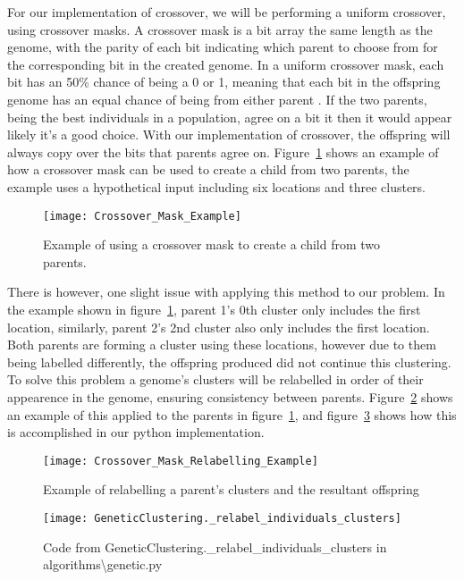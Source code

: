 \noindent
For our implementation of crossover, we will be performing a uniform crossover, using crossover masks.
A crossover mask is a bit array the same length as the genome, with the parity of each bit indicating which parent
to choose from for the corresponding bit in the created genome.
In a uniform crossover mask, each bit has an 50\% chance of being a 0 or 1, meaning that each bit in the offspring
genome has an equal chance of being from either parent
.
If the two parents, being the best individuals in a population, agree on a bit it then it would appear likely it's a
good choice.
With our implementation of crossover, the offspring will always copy over the bits that parents agree on.
Figure~\ref{fig:Crossover_Mask_Example} shows an example of how a crossover mask can be used to create a child from
two parents, the example uses a hypothetical input including six locations and three clusters.
\begin{figure}[H]
    \centering
    \texttt{[image: Crossover\_Mask\_Example]}
    \caption{Example of using a crossover mask to create a child from two parents.}\label{fig:Crossover_Mask_Example}
\end{figure}

\noindent
There is however, one slight issue with applying this method to our problem.
In the example shown in figure~\ref{fig:Crossover_Mask_Example}, parent 1's 0th cluster only includes the first
location, similarly, parent 2's 2nd cluster also only includes the first location.
Both parents are forming a cluster using these locations, however due to them being labelled differently, the
offspring produced did not continue this clustering.
To solve this problem a genome's clusters will be relabelled in order of their appearence in the genome, ensuring
consistency between parents.
Figure~\ref{fig:Crossover_Mask_Relabelling_Example} shows an example of this applied to the parents in figure~\ref{fig:Crossover_Mask_Example},
and figure~\ref{fig:GeneticClustering._relabel_individuals_clusters} shows how this is accomplished in our python
implementation.
\begin{figure}[H]
    \centering
    \texttt{[image: Crossover\_Mask\_Relabelling\_Example]}
    \caption{Example of relabelling a parent's clusters and the resultant offspring}\label{fig:Crossover_Mask_Relabelling_Example}
\end{figure}
\begin{figure}[H]
    \centering
    \texttt{[image: GeneticClustering.\_relabel\_individuals\_clusters]}
    \caption{Code from GeneticClustering.\_relabel\_individuals\_clusters in algorithms\textbackslash genetic.py}\label{fig:GeneticClustering._relabel_individuals_clusters}
\end{figure}

